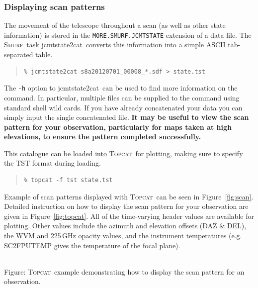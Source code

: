 \documentclass[twoside,11pt]{article}
\newcommand{\htmladdnormallink}[2]{#1}
\newcommand{\htmladdimg}[1]{}
\newcommand{\xref}[3]{#1}
\newcommand{\xlabel}[1]{}
\renewcommand{\_}{\texttt{\symbol{95}}}
\newenvironment{myquote}{\begin{quote}\begin{small}}{\end{small}\end{quote}}
\newcommand{\smurf}{\xref{\textsc{Smurf}}{sun258}{}}
\newcommand{\topcat}{\htmladdnormallink{\textsc{Topcat}}{http://www.starlink.ac.uk/topcat}}
\newcommand{\task}[1]{\textsf{#1}}
\newcommand{\jcmtstate}{\xref{\task{jcmtstate2cat}}{sun258}{JCMTSTATE2CAT}}
\begin{document}
\subsubsection{\xlabel{scan_pat}Displaying scan patterns}
\label{sec:scan}

The movement of the telescope throughout a scan (as well as other
state information) is stored in the \texttt{MORE.SMURF.JCMTSTATE}
extension of a data file. The \smurf\ task \jcmtstate\ converts this
information into a simple ASCII tab-separated table.

\begin{myquote}
\begin{verbatim}
% jcmtstate2cat s8a20120701_00008_*.sdf > state.tst
\end{verbatim}
\end{myquote}

The \texttt{-h} option to \jcmtstate\ can be used to find more information on
the command. In particular, multiple files can be supplied to the
command using standard shell wild cards. If you have already
concatenated your data you can simply input the single concatenated
file. \textbf{It may be useful to view the scan pattern for your
observation, particularly for maps taken at high elevations, to ensure
the pattern completed successfully.}

This catalogue can be loaded into \topcat\ for plotting, making sure
to specify the TST format during loading.

\begin{myquote}
\begin{verbatim}
% topcat -f tst state.tst
\end{verbatim}
\end{myquote}

Example of scan patterns displayed with \topcat\ can be seen in
Figure~\ref{fig:scan}. Detailed instruction on how to display the scan
pattern for your observation are given in Figure~\ref{fig:topcat}. All
of the time-varying header values are available for plotting.  Other
values include the azimuth and elevation offsets (DAZ \& DEL), the WVM
and 225\,GHz opacity values, and the instrument temperatures (e.g.
SC2\_FPUTEMP gives the temperature of the focal plane).

\begin{htmlonly}
 \label{fig:topcat} \htmladdimg{sc21_topcat_example.png}
 \\
 Figure: \topcat\ example demonstrating how to display the scan
 pattern for an observation.\\ \\
\end{htmlonly}
\end{document}
